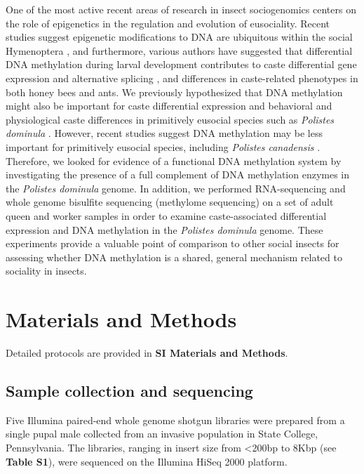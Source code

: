 One of the most active recent areas of research in insect sociogenomics
centers on the role of epigenetics in the regulation and evolution of
eusociality. Recent studies suggest epigenetic modifications to DNA are
ubiquitous within the social Hymenoptera \cite{Kronforst2008,Weiner2013}, and
furthermore, various authors have suggested that differential DNA
methylation during larval development contributes to caste differential
gene expression and alternative splicing \cite{Dnmt3KD,Lyko2010}, and
differences in caste-related phenotypes \cite{Kucharski2008} in
both honey bees and ants. We previously hypothesized that DNA
methylation might also be important for caste differential expression
and behavioral and physiological caste differences in primitively
eusocial species such as \textit{Polistes dominula} \cite{Weiner2013,Weiner2012}. However,
recent studies suggest DNA methylation may be less important for
primitively eusocial species, including \textit{Polistes canadensis} \cite{KapheimTenBee,PcanGenome}.
 Therefore, we looked for evidence of a functional DNA
methylation system by investigating the presence of a full complement of
DNA methylation enzymes in the \textit{Polistes dominula} genome. In
addition, we performed RNA-sequencing and whole genome bisulfite
sequencing (methylome sequencing) on a set of adult queen and worker
samples in order to examine caste-associated differential expression and
DNA methylation in the \textit{Polistes dominula} genome. These
experiments provide a valuable point of comparison to other social
insects for assessing whether DNA methylation is a shared, general
mechanism related to sociality in insects.

\section{Materials and Methods}

Detailed protocols are provided in \textbf{SI Materials and Methods}.

\subsection{Sample collection and sequencing} Five Illumina paired-end
whole genome shotgun libraries were prepared from a single pupal male
collected from an invasive population in State College, Pennsylvania.
The libraries, ranging in insert size from \textless{}200bp to 8Kbp (see
\textbf{Table S1}), were sequenced on the Illumina HiSeq 2000 platform.

